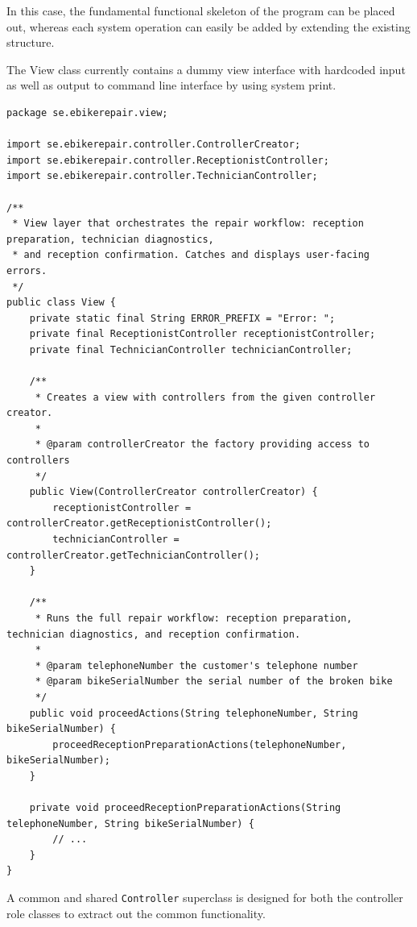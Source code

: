 \documentclass[a4paper]{scrartcl}
\begin{document}
In this case, the fundamental functional skeleton of the program can be placed out, whereas each system operation can easily be added by extending the existing structure.

The View class currently contains a dummy view interface with hardcoded input as well as output to command line interface by using system print.

\begin{lstlisting}[style=javastyle, caption={Main class entry point}]
package se.ebikerepair.view;

import se.ebikerepair.controller.ControllerCreator;
import se.ebikerepair.controller.ReceptionistController;
import se.ebikerepair.controller.TechnicianController;

/**
 * View layer that orchestrates the repair workflow: reception preparation, technician diagnostics,
 * and reception confirmation. Catches and displays user-facing errors.
 */
public class View {
    private static final String ERROR_PREFIX = "Error: ";
    private final ReceptionistController receptionistController;
    private final TechnicianController technicianController;

    /**
     * Creates a view with controllers from the given controller creator.
     *
     * @param controllerCreator the factory providing access to controllers
     */
    public View(ControllerCreator controllerCreator) {
        receptionistController = controllerCreator.getReceptionistController();
        technicianController = controllerCreator.getTechnicianController();
    }

    /**
     * Runs the full repair workflow: reception preparation, technician diagnostics, and reception confirmation.
     *
     * @param telephoneNumber the customer's telephone number
     * @param bikeSerialNumber the serial number of the broken bike
     */
    public void proceedActions(String telephoneNumber, String bikeSerialNumber) {
        proceedReceptionPreparationActions(telephoneNumber, bikeSerialNumber);
    }

    private void proceedReceptionPreparationActions(String telephoneNumber, String bikeSerialNumber) {
        // ...
    }
}

\end{lstlisting}

A common and shared \texttt{Controller} superclass is designed for both the controller role classes to extract out the common functionality.
\end{document}
